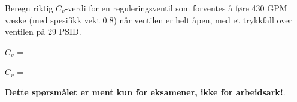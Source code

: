 

Beregn riktig $C_v$-verdi for en reguleringsventil som forventes å føre 430 GPM væske (med spesifikk vekt 0.8) når ventilen er helt åpen, med et trykkfall over ventilen på 29 PSID.

\vskip 10pt

$C_v$ = \underbar{\hskip 50pt}







$C_v$ = 







{\bf Dette spørsmålet er ment kun for eksamener, ikke for arbeidsark!}.


